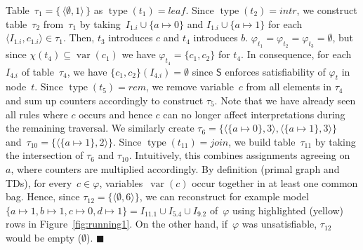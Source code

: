 \documentclass{llncs}
\newcommand{\SB}{\{\,}%
\newcommand{\SE}{\,\}}%
\newcommand{\algo}[1]{\ensuremath{\mathsf{#1}}}
\newcommand{\tab}[1]{\ensuremath{\tau_{#1}}}
\DeclareMathOperator{\var}{var}
\DeclareMathOperator{\type}{type}
\newcommand{\intr}{\textit{intr}}
\newcommand{\leaf}{\textit{leaf}}
\newcommand{\rem}{\textit{rem}}
\newcommand{\join}{\textit{join}}
\renewenvironment{example}{\begin{EXa}}{\hfill\ensuremath{\blacksquare}\end{EXa}}
\begin{document}
\begin{example}
  Table~$\tab{1}=\SB \langle\emptyset, 1\rangle \SE$ as
  $\type(t_1) = \leaf$.
  Since $\type(t_2) = \intr$, we construct table~$\tab{2}$
  from~$\tab{1}$ by taking~$I_{1.i}\cup\{a\mapsto 0\}$ and $I_{1.i}\cup \{a \mapsto 1\}$ for
  each~$\langle I_{1.i}, c_{1.i}\rangle \in \tab{1}$. Then,
  $t_3$ introduces $c$ and $t_4$ introduces $b$.
  $\varphi_{t_1}=\varphi_{t_2}=\varphi_{t_3} = \emptyset$, but since
  $\chi(t_4) \subseteq \var(c_1)$ we have
  $\varphi_{t_4} = \{c_1,c_2\}$ for $t_4$.
  In consequence, for each~$I_{4.i}$ of table~$\tab{4}$, we have
  $\{c_1,c_2\}({{I_{4.i}}})=\emptyset$ since \algo{S} enforces
  satisfiability of $\varphi_t$ in node~$t$.  
  Since $\type(t_5) = \rem$, we remove variable~$c$ from all
  elements in $\tab{4}$ and sum up counters accordingly to construct $\tab{5}$. 
  Note that we have
  already seen all rules where $c$ occurs and hence $c$ can no
  longer affect interpretations during the remaining traversal. We
  similarly create $\tab{6}=\{\langle \{a\mapsto 0\}, 3 \rangle, \langle \{a \mapsto 1\}, 3 \rangle\}$
  and~$\tab{{10}}=\{\langle \{a \mapsto 1\}, 2 \rangle\}$.
  Since $\type(t_{11})=\join$, we build table~$\tab{11}$ by taking
  the intersection of $\tab{6}$ and $\tab{{10}}$. Intuitively, this
  combines assignments agreeing on~$a$, where counters are multiplied accordingly.
  By definition (primal graph and TDs), for every~$c \in \varphi$,
  variables~$\var(c)$ occur together in at least one common bag.
  Hence, %
  since
  $\tab{12} = \{\langle \emptyset, 6 \rangle \}$, we can reconstruct for example
  model~$\{a\mapsto 1,b \mapsto 1, c\mapsto 0, d\mapsto 1\} = I_{11.1} \cup I_{5.4} \cup I_{9.2}$ of~$\varphi$ using highlighted (yellow) rows in Figure~\ref{fig:running1}.
  On the other hand, if~$\varphi$ was unsatisfiable, $\tab{12}$ would be empty ($\emptyset$). %
%
%
%
\end{example}%
\end{document}
